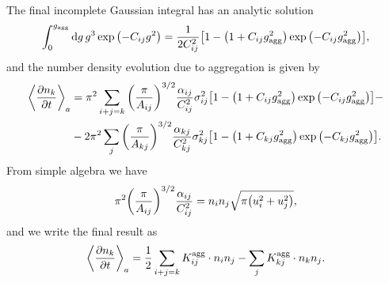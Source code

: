 \documentclass[aps,prl,preprint,groupedaddress,10pt]{revtex4-2}
\begin{document}
The final incomplete Gaussian integral has an analytic solution
\begin{equation}
    \int_{0}^{\ltx{g}{agg}}\dd{g}g^3\exp\pqty{-C_{ij}g^2}=
    \frac{1}{2C_{ij}^2}\bqty{1-\pqty{1+C_{ij}\ltx{g}{agg}^2}\exp\pqty{-C_{ij}\ltx{g}{agg}^2}},
\end{equation}
and the number density evolution due to aggregation is given by
\begin{equation}
    \begin{split}
        \avg{\pdv{n_k}{t}}_a&=\pi^2\sum_{i+j=k}\pqty{\frac{\pi}{A_{ij}}}^{3/2}
        \frac{\alpha_{ij}}{C_{ij}^2}\sigma_{ij}^2
        \bqty{1-\pqty{1+C_{ij}\ltx{g}{agg}^2}\exp\pqty{-C_{ij}\ltx{g}{agg}^2}}-\\
        &-2\pi^2\sum_{j}\pqty{\frac{\pi}{A_{kj}}}^{3/2}\frac{\alpha_{kj}}{C_{kj}^2}\sigma_{kj}^2
        \bqty{1-\pqty{1+C_{kj}\ltx{g}{agg}^2}\exp\pqty{-C_{kj}\ltx{g}{agg}^2}}.
    \end{split}
\end{equation}
From simple algebra we have
\begin{equation}
    \pi^2\pqty{\frac{\pi}{A_{ij}}}^{3/2}\frac{\alpha_{ij}}{C_{ij}^2}=n_in_j\sqrt{\pi\pqty{u_i^2+u_j^2}},
\end{equation}
and we write the final result as
\begin{equation}
    \left\langle{\pdv{n_k}{t}}\right\rangle_a=\frac{1}{2}\sum_{i+j=k}K^{\mathrm{agg}}_{ij}\cdot n_in_j
    -\sum_{j}K^{\mathrm{agg}}_{kj}\cdot n_kn_j.
\end{equation}
\end{document}

